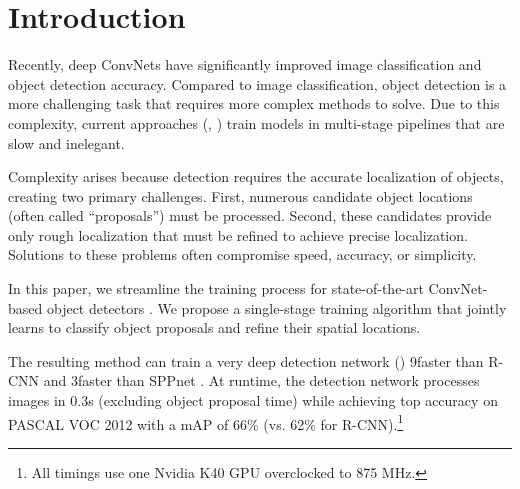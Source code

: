 \section{Introduction}

Recently, deep ConvNets \cite{krizhevsky2012imagenet,lecun89e} have significantly improved image classification \cite{krizhevsky2012imagenet} and object detection \cite{girshick2014rcnn,overfeat} accuracy.
Compared to image classification, object detection is a more challenging task that requires more complex methods to solve.
Due to this complexity, current approaches (\eg, \cite{girshick2014rcnn,he2014spp,overfeat,Zhu2015segDeepM}) train models in multi-stage pipelines that are slow and inelegant.

Complexity arises because detection requires the accurate localization of objects, creating two primary challenges.
First, numerous candidate object locations (often called ``proposals'') must be processed.
Second, these candidates provide only rough localization that must be refined to achieve precise localization.
Solutions to these problems often compromise speed, accuracy, or simplicity.

In this paper, we streamline the training process for state-of-the-art ConvNet-based object detectors \cite{girshick2014rcnn,he2014spp}.
We propose a single-stage training algorithm that jointly learns to classify object proposals and refine their spatial locations.

The resulting method can train a very deep detection network (\vggsixteen \cite{simonyan2015verydeep}) 9\X faster than R-CNN \cite{girshick2014rcnn} and 3\X faster than SPPnet \cite{he2014spp}.
At runtime, the detection network processes images in 0.3s (excluding object proposal time) while achieving top accuracy on PASCAL VOC 2012 \cite{Pascal-IJCV} with a mAP of 66\% (vs. 62\% for R-CNN).\footnote{All timings use one Nvidia K40 GPU overclocked to 875 MHz.}


